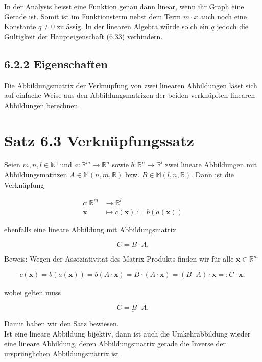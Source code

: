 \documentclass[10pt]{article}
\begin{document}
In der Analysis heisst eine Funktion genau dann linear, wenn ihr Graph eine Gerade ist. Somit ist im Funktionsterm nebst dem Term $m \cdot x$ auch noch eine Konstante $q \neq 0$ zulässig. In der linearen Algebra würde solch ein $q$ jedoch die Gültigkeit der Haupteigenschaft (6.33) verhindern.

\subsection*{6.2.2 Eigenschaften}
Die Abbildungsmatrix der Verknüpfung von zwei linearen Abbildungen lässt sich auf einfache Weise aus den Abbildungsmatrizen der beiden verknüpften linearen Abbildungen berechnen.

\section*{Satz 6.3 Verknüpfungssatz}
Seien $m, n, l \in \mathbb{N}^{+}$und $a: \mathbb{R}^{m} \rightarrow \mathbb{R}^{n}$ sowie $b: \mathbb{R}^{n} \rightarrow \mathbb{R}^{l}$ zwei lineare Abbildungen mit Abbildungsmatrizen $A \in \mathbb{M}(n, m, \mathbb{R})$ bzw. $B \in \mathbb{M}(l, n, \mathbb{R})$. Dann ist die Verknüpfung


\begin{align*}
c: \mathbb{R}^{m} & \rightarrow \mathbb{R}^{l} \\
\mathbf{x} & \mapsto c(\mathbf{x}):=b(a(\mathbf{x})) \tag{6.37}
\end{align*}


ebenfalls eine lineare Abbildung mit Abbildungsmatrix


\begin{equation*}
C=B \cdot A . \tag{6.38}
\end{equation*}


Beweis: Wegen der Assoziativität des Matrix-Produkts finden wir für alle $\mathbf{x} \in \mathbb{R}^{m}$


\begin{equation*}
c(\mathbf{x})=b(a(\mathbf{x}))=b(A \cdot \mathbf{x})=B \cdot(A \cdot \mathbf{x})=\underline{(B \cdot A) \cdot \mathbf{x}=: C \cdot \mathbf{x},} \tag{6.39}
\end{equation*}


wobei gelten muss


\begin{equation*}
\underline{C=B \cdot A .} \tag{6.40}
\end{equation*}


Damit haben wir den Satz bewiesen.\\
Ist eine lineare Abbildung bijektiv, dann ist auch die Umkehrabbildung wieder eine lineare Abbildung, deren Abbildungsmatrix gerade die Inverse der ursprünglichen Abbildungsmatrix ist.
\end{document}
